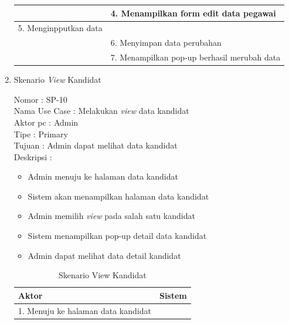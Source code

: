 \begin{enumerate}
\begin{table}
\begin{tabular}{ | p{72mm} | p{56mm} |}
		\hline
		
		& 4.	Menampilkan form edit data pegawai \\
		
		\hline
		
		5.	Menginpputkan data  & \\
		\hline
		
			& 6.	Menyimpan data perubahan \\
		
		\hline
		
		& 7.	Menampilkan pop-up berhasil merubah data \\
		
		\hline
		
		
	\end{tabular}
\end{table}

\newpage

\item Skenario \textit{View} Kandidat

Nomor \kern 3.6pc : SP-10 \\
Nama Use Case : Melakukan \textit{view} data kandidat \\
Aktor  pc : Admin \\
Tipe \kern 4.6pc : Primary \\
Tujuan \kern 3.6pc : Admin dapat melihat data kandidat \\
Deskripsi \kern 2.5pc : 

\begin{itemize}
	\item Admin menuju ke halaman data kandidat
	\item Sistem akan menampilkan halaman data kandidat
	\item Admin memilih \textit{view} pada salah satu kandidat
	\item Sistem menampilkan pop-up detail data kandidat
	\item Admin dapat melihat data detail kandidat
	
\end{itemize}

\begin{table}
	\caption{Skenario View Kandidat}
	\centering
	\begin{tabular}{ |  p{73mm} | p{55mm} |}
		\hline 
		\textbf{Aktor} & \textbf{Sistem} \\
		\hline
		
		1.	Menuju ke halaman data kandidat &  \\
		

\end{tabular}
\end{table}
\end{enumerate}
